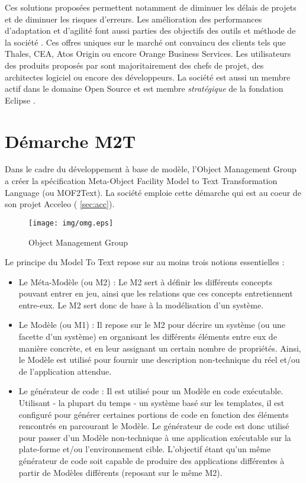 Ces solutions proposées permettent notamment de diminuer les délais de projets et de diminuer les risques d'erreurs. Les amélioration des performances d'adaptation et d'agilité font aussi parties des objectifs des outils et méthode de la société \kwobeo{}. Ces offres uniques sur le marché ont convaincu des clients tels que Thales, CEA, Atos Origin ou encore Orange Business Services. Les utilisateurs des produits proposés par \kwobeo sont majoritairement des chefs de projet, des architectes logiciel ou encore des développeurs.
La société \kwobeo{} est aussi un membre actif dans le domaine Open Source et est membre \emph{stratégique} de la fondation Eclipse \cite{fondation}.

\clearpage

\section{Démarche M2T}\label{sec:m2t}

Dans le cadre du développement à base de modèle, l'Object Management Group \cite{omg} a créer la spécification Meta-Object Facility Model to Text Transformation Language (ou MOF2Text). La société \kwobeo emploie cette démarche qui est au coeur de son projet Acceleo (\cf{} \ref{sec:acc}).

\begin{figure}[htb]
  \centering
  \texttt{[image: img/omg.eps]}
  \caption{Object Management Group}
  \label{fig:omg}
\end{figure}


Le principe du Model To Text repose sur au moins trois notions essentielles :
\begin{itemize}
\item Le Méta-Modèle (ou M2) : Le M2 sert à définir les différents concepts pouvant entrer en jeu, ainsi que les relations que ces concepts entretiennent entre-eux. Le M2 sert donc de base à la modélisation d'un système.
\item Le Modèle (ou M1) : Il repose sur le M2 pour décrire un système (ou une facette d'un système) en organisant les différents éléments entre eux de manière concrète, et en leur assignant un certain nombre de propriétés. Ainsi, le Modèle est utilisé pour fournir une description non-technique du réel et/ou de l'application attendue.
\item Le générateur de code : Il est utilisé pour  un Modèle en code exécutable. Utilisant - la plupart du temps - un système basé sur les templates, il est configuré pour générer certaines portions de code en fonction des éléments rencontrés en parcourant le Modèle. Le générateur de code est donc utilisé pour passer d'un Modèle non-technique à une application exécutable sur la plate-forme et/ou l'environnement cible. L'objectif étant qu'un même générateur de code soit capable de produire des applications différentes à partir de Modèles différents (reposant sur le même M2).\\
\end{itemize}

